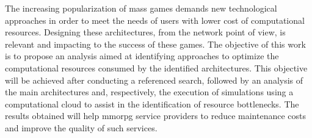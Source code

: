 The increasing popularization of mass games demands new technological approaches in order to meet the needs of users with lower cost of computational resources.
%
Designing these architectures, from the network point of view, is relevant and impacting to the success of these games.
%
The objective of this work is to propose an analysis aimed at identifying approaches to optimize the computational resources consumed by the identified architectures.
%
This objective will be achieved after conducting a referenced search, followed by an analysis of the main architectures and, respectively, the execution of simulations using a computational cloud to assist in the identification of resource bottlenecks.
%
The results obtained will help \ac{mmorpg} service providers to reduce maintenance costs and improve the quality of such services.